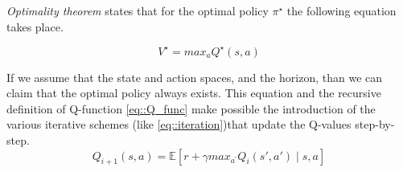 \documentclass[a0]{a0poster}
\begin{document}
\begin{textblock}{7.0}
\textit{Optimality theorem} states that for the optimal policy $\pi^\star$ the following equation takes place.

\begin{equation}
V^\star  = max _a Q^\star(s,a)
\end{equation}

If we assume that the state and action spaces, and the horizon, than we can claim that the optimal policy always exists.
This equation and the recursive definition of Q-function \eqref{eq::Q_func} make possible the introduction of the various iterative schemes (like \eqref{eq::iteration})that update the Q-values step-by-step.
\begin{equation}\label{eq::iteration}
Q_{i+1}(s, a) = \mathbb{E}\left[r + \gamma max_{a^{'}} Q_i(s', a') \mid s, a\right]
\end{equation}


\end{textblock}
\end{document}
